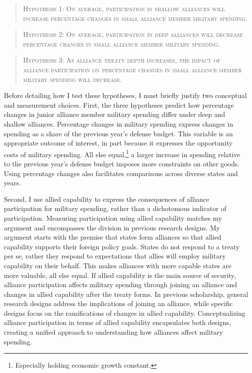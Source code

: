 \documentclass[12pt]{article}
\begin{document}
\begin{quote}
\textsc{Hypothesis 1: On average, participation in shallow alliances will increase percentage changes in small alliance member military spending.}
\end{quote}

\begin{quote}
\textsc{Hypothesis 2: On average, participation in deep alliances will decrease percentage changes in small alliance member military spending.}
\end{quote}

\begin{quote}
\textsc{Hypothesis 3: As alliance treaty depth increases, the impact of alliance participation on percentage changes in small alliance member military spending will decrease.}
\end{quote}


Before detailing how I test these hypotheses, I must briefly justify two conceptual and measurement choices. 
First, the three hypotheses predict how percentage changes in junior alliance member military spending differ under deep and shallow alliances. 
Percentage changes in military spending express changes in spending as a share of the previous year's defense budget.
This variable is an appropriate outcome of interest, in part because it expresses the opportunity costs of military spending. 
All else equal,\footnote{Especially holding economic growth constant.} a larger increase in spending relative to the previous year's defense budget imposes more constraints on other goods. 
Using percentage changes also facilitates comparisons across diverse states and years. 


Second, I use allied capability to express the consequences of alliance participation for military spending, rather than a dichotomous indicator of participation.
Measuring participation using allied capability matches my argument and encompasses the division in  previous research designs. 
My argument starts with the premise that states form alliances so that allied capability supports their foreign policy goals. 
States do not respond to a treaty per se, rather they respond to expectations that allies will employ military capability on their behalf.
This makes alliances with more capable states are more valuable, all else equal.
If allied capability is the main source of security, alliance participation affects military spending through joining an alliance and changes in allied capability after the treaty forms. 
In previous scholarship, general research designs address the implications of joining an alliance, while specific designs focus on the ramifications of changes in allied capability. 
Conceptualizing alliance participation in terms of allied capability encapsulates both designs, creating a unified approach to understanding how alliances affect military spending. 
\end{document}
